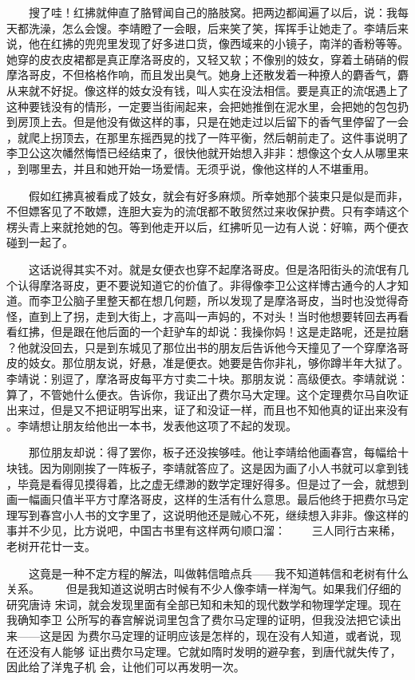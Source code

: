 　　搜了哇！红拂就伸直了胳臂闻自己的胳肢窝。把两边都闻遍了以后，说：我每 天都洗澡，怎么会馊。李靖瞪了一会眼，后来笑了笑，挥挥手让她走了。李靖后来 说，他在红拂的兜兜里发现了好多进口货，像西域来的小镜子，南洋的香粉等等。 她穿的皮衣皮裙都是真正摩洛哥皮的，又轻又软；不像别的妓女，穿着土硝硝的假 摩洛哥皮，不但格格作响，而且发出臭气。她身上还散发着一种撩人的麝香气，麝 从来就不好捉。像这样的妓女没有钱，叫人实在没法相信。要是真正的流氓遇上了 这种要钱没有的情形，一定要当街闹起来，会把她推倒在泥水里，会把她的包包扔 到房顶上去。但是他没有做这样的事，只是在她走过以后留下的香气里停留了一会 ，就爬上拐顶去，在那里东摇西晃的找了一阵平衡，然后朝前走了。这件事说明了 李卫公这次幡然悔悟已经结束了，很快他就开始想入非非：想像这个女人从哪里来 ，到哪里去，并且和她开始一场爱情。无须乎说，像他这样的人不堪重用。

 　　假如红拂真被看成了妓女，就会有好多麻烦。所幸她那个装束只是似是而非， 不但嫖客见了不敢嫖，连胆大妄为的流氓都不敢贸然过来收保护费。只有李靖这个 楞头青上来就抢她的包。等到他走开以后，红拂听见一边有人说：好嘛，两个便衣 碰到一起了。 

　　这话说得其实不对。就是女便衣也穿不起摩洛哥皮。但是洛阳街头的流氓有几 个认得摩洛哥皮，更不要说知道它的价值了。非得像李卫公这样博古通今的人才知 道。而李卫公脑子里整天都在想几何题，所以发现了是摩洛哥皮，当时也没觉得奇 怪，直到上了拐，走到大街上，才高叫一声妈的，不对头！当时他想要转回去再看 看红拂，但是跟在他后面的一个赶驴车的却说：我操你妈！这是走路呢，还是拉磨 ？他就没回去，只是到东城见了那位出书的朋友后告诉他今天撞见了一个穿摩洛哥 皮的妓女。那位朋友说，好悬，准是便衣。她要是告你非礼，够你蹲半年大狱了。 李靖说：别逗了，摩洛哥皮每平方寸卖二十块。那朋友说：高级便衣。李靖就说： 算了，不管她什么便衣。告诉你，我证出了费尔马大定理。这个定理费尔马自吹证 出来过，但是又不把证明写出来，证了和没证一样，而且也不知他真的证出来没有 。李靖想让朋友给他出一本书，发表他这项了不起的发现。 

　　那位朋友却说：得了罢你，板子还没挨够哇。他让李靖给他画春宫，每幅给十 块钱。因为刚刚挨了一阵板子，李靖就答应了。这是因为画了小人书就可以拿到钱 ，毕竟是看得见摸得着，比之虚无缥渺的数学定理好得多。但是过了一会，就想到 画一幅画只值半平方寸摩洛哥皮，这样的生活有什么意思。最后他终于把费尔马定 理写到春宫小人书的文字里了，这说明他还是贼心不死，继续想入非非。像这样的 事并不少见，比方说吧，中国古书里有这样两句顺口溜： 　　三人同行古来稀，老树开花廿一支。

 　　这竟是一种不定方程的解法，叫做韩信暗点兵——我不知道韩信和老树有什么 关系。 　　但是我知道这说明古时候有不少人像李靖一样淘气。如果我们仔细的研究唐诗 宋词，就会发现里面有全部已知和未知的现代数学和物理学定理。现在我确知李卫 公所写的春宫解说词里包含了费尔马定理的证明，但我没法把它读出来——这是因 为费尔马定理的证明应该是怎样的，现在没有人知道，或者说，现在还没有人能够 证出费尔马定理。它就如隋时发明的避孕套，到唐代就失传了，因此给了洋鬼子机 会，让他们可以再发明一次。

